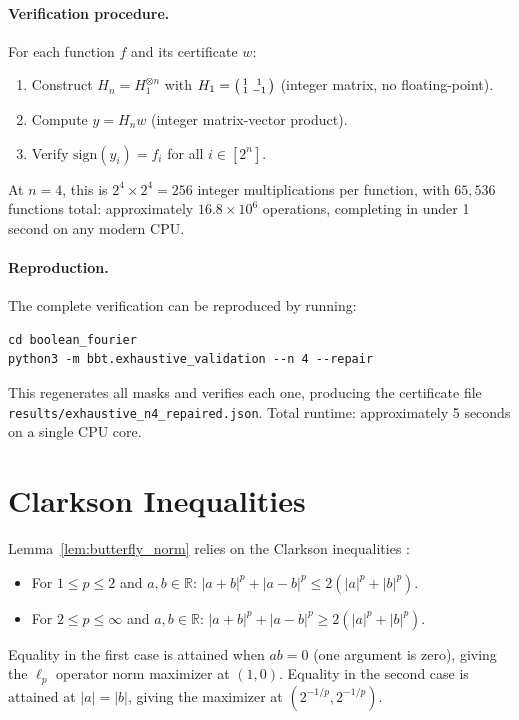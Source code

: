 \documentclass[11pt]{article}
\newcommand{\R}{\mathbb{R}}
\newcommand{\sign}{\mathrm{sign}}
\begin{document}
\paragraph{Verification procedure.}
For each function $f$ and its certificate $w$:
\begin{enumerate}
    \item Construct $H_n = H_1^{\otimes n}$ with $H_1 = \begin{psmallmatrix} 1 & 1 \\ 1 & -1 \end{psmallmatrix}$ (integer matrix, no floating-point).
    \item Compute $y = H_n w$ (integer matrix-vector product).
    \item Verify $\sign(y_i) = f_i$ for all $i \in [2^n]$.
\end{enumerate}
At $n=4$, this is $2^4 \times 2^4 = 256$ integer multiplications per function, with $65{,}536$ functions total: approximately $16.8 \times 10^6$ operations, completing in under 1 second on any modern CPU.

\paragraph{Reproduction.}
The complete verification can be reproduced by running:
\begin{verbatim}
cd boolean_fourier
python3 -m bbt.exhaustive_validation --n 4 --repair
\end{verbatim}
This regenerates all masks and verifies each one, producing the certificate file \texttt{results/exhaustive\_n4\_repaired.json}. Total runtime: approximately 5 seconds on a single CPU core.

\section{Clarkson Inequalities}
\label{app:clarkson}

Lemma~\ref{lem:butterfly_norm} relies on the Clarkson inequalities \cite{clarkson1936uniformly}:

\begin{itemize}
    \item For $1 \le p \le 2$ and $a, b \in \R$: $|a+b|^p + |a-b|^p \le 2(|a|^p + |b|^p)$.
    \item For $2 \le p \le \infty$ and $a, b \in \R$: $|a+b|^p + |a-b|^p \ge 2(|a|^p + |b|^p)$.
\end{itemize}

Equality in the first case is attained when $ab = 0$ (one argument is zero), giving the $\ell_p$ operator norm maximizer at $(1, 0)$. Equality in the second case is attained at $|a| = |b|$, giving the maximizer at $(2^{-1/p}, 2^{-1/p})$.
\end{document}
